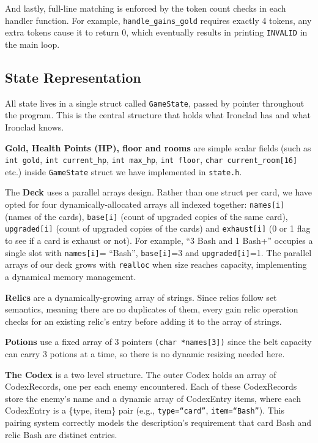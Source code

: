 \documentclass[12pt,a4paper]{article}
\begin{document}
And lastly, full-line matching is enforced by the token count checks in each handler function. For example, \texttt{handle\_gains\_gold} requires exactly 4 tokens, any extra tokens cause it to return 0, which eventually results in printing \texttt{INVALID} in the main loop.

\subsection{State Representation}

All state lives in a single struct called \texttt{GameState}, passed by pointer throughout the program. This is the central structure that holds what Ironclad has and what Ironclad knows.

\textbf{Gold, Health Points (HP), floor and rooms} are simple scalar fields (such as \texttt{int gold}, \texttt{int current\_hp}, \texttt{int max\_hp}, \texttt{int floor}, \texttt{char current\_room[16]} etc.) inside \texttt{GameState} struct we have implemented in \texttt{state.h}.

The \textbf{Deck} uses a parallel arrays design. Rather than one struct per card, we have opted for four dynamically-allocated arrays all indexed together: \texttt{names[i]} (names of the cards), \texttt{base[i]} (count of upgraded copies of the same card), \texttt{upgraded[i]} (count of upgraded copies of the cards) and \texttt{exhaust[i]} (0 or 1 flag to see if a card is exhaust or not). For example, ``3 Bash and 1 Bash+'' occupies a single slot with \texttt{names[i]}= ``Bash'', \texttt{base[i]}=3 and \texttt{upgraded[i]}=1. The parallel arrays of our deck grows with \texttt{realloc} when size reaches capacity, implementing a dynamical memory management.

\textbf{Relics} are a dynamically-growing array of strings. Since relics follow set semantics, meaning there are no duplicates of them, every gain relic operation checks for an existing relic's entry before adding it to the array of strings.

\textbf{Potions} use a fixed array of 3 pointers \texttt{(char *names[3])} since the belt capacity can carry 3 potions at a time, so there is no dynamic resizing needed here.

\textbf{The Codex} is a two level structure. The outer Codex holds an array of CodexRecords, one per each enemy encountered. Each of these CodexRecords store the enemy's name and a dynamic array of CodexEntry items, where each CodexEntry is a \{type, item\} pair (e.g., \texttt{type=``card''}, \texttt{item=``Bash''}). This pairing system correctly models the description's requirement that card Bash and relic Bash are distinct entries.
\end{document}
